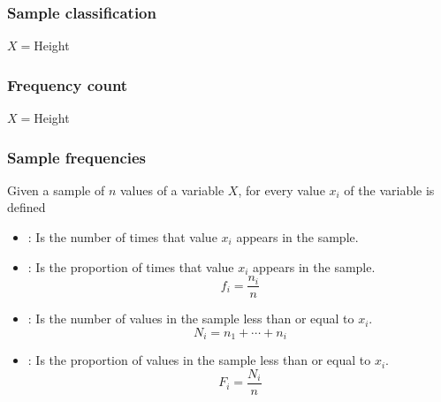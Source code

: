 \begin{frame}
\frametitle{Sample classification}
$X=$Height
\begin{center}
\scalebox{0.6}{}
\end{center}
\end{frame}


\begin{frame}
\frametitle{Frequency count}
$X=$Height
\begin{center}
\scalebox{0.6}{}
\end{center}
\end{frame}


\begin{frame}
\frametitle{Sample frequencies}
\begin{definition}
Given a sample of $n$ values of a variable $X$, for every value $x_i$ of the variable
is defined 
\begin{itemize}
\item {}: Is the number of times that value $x_i$ appears in the sample.
\item {}: Is the proportion of times that value $x_i$ appears in the sample.
\[
f_i = \frac{n_i}{n}
\]
\item {}: Is the number of values in the sample less than or equal to
$x_i$.
\[
N_i = n_1 + \cdots + n_i
\]
\item {}: Is the proportion of values in the sample less than or equal to
$x_i$.
\[
F_i = \frac{N_i}{n}
\]
\end{itemize}
\end{definition}
\end{frame}



